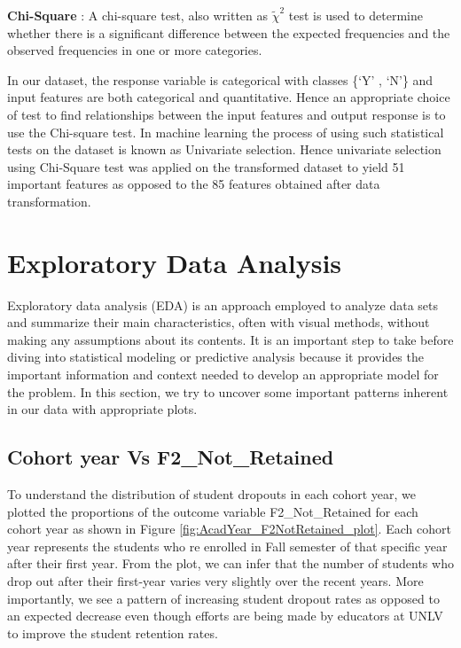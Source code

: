 \documentclass[11pt,openright]{report}
\begin{document}
\noindent \textbf{Chi-Square} : A chi-square test, also written as $\tilde{\chi}^2$ test is used to determine whether there is a significant difference between the expected frequencies and the observed frequencies in one or more categories.

In our dataset, the response variable is categorical with classes \{`Y' , `N'\} and input features are both categorical and quantitative. Hence an appropriate choice of test to find relationships between the input features and output response is to use the Chi-square test. In machine learning the process of using such statistical tests on the dataset is known as Univariate selection. Hence univariate selection using Chi-Square test was applied on the transformed dataset to yield 51 important features as opposed to the 85 features obtained after data transformation.


\section{Exploratory Data Analysis}
Exploratory data analysis (EDA) is an approach employed to analyze data sets and summarize their main characteristics, often with visual methods, without making any assumptions about its contents. It is an important step to take before diving into statistical modeling or predictive analysis because it provides the important information and context needed to develop an appropriate model for the problem. In this section, we try to uncover some important patterns inherent in our data with appropriate plots.



\subsection {Cohort year Vs F2\_Not\_Retained}

To understand the distribution of student dropouts in each cohort year, we plotted the proportions of the outcome variable F2\_Not\_Retained for each cohort year as shown in Figure \ref{fig:AcadYear_F2NotRetained_plot}. Each cohort year represents the students who re enrolled in Fall semester of that specific year after their first year. From the plot, we can infer that the number of students who drop out after their first-year varies very slightly over the recent years. More importantly, we see a pattern of increasing student dropout rates as opposed to an expected decrease even though efforts are being made by educators at UNLV to improve the student retention rates.
\end{document}
